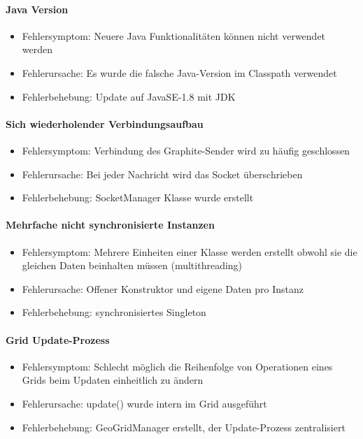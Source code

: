 \paragraph{Java Version}
\begin{itemize}
	\item Fehlersymptom: Neuere Java Funktionalitäten können nicht verwendet werden
	\item Fehlerursache: Es wurde die falsche Java-Version im Classpath verwendet
	\item Fehlerbehebung: Update auf JavaSE-1.8 mit JDK
\end{itemize}

\paragraph{Sich wiederholender Verbindungsaufbau}
\begin{itemize}
	\item Fehlersymptom: Verbindung des Graphite-Sender wird zu häufig geschlossen
	\item Fehlerursache: Bei jeder Nachricht wird das Socket überschrieben
	\item Fehlerbehebung: SocketManager Klasse wurde erstellt
\end{itemize}

\paragraph{Mehrfache nicht synchronisierte Instanzen}
\begin{itemize}
	\item Fehlersymptom: Mehrere Einheiten einer Klasse werden erstellt obwohl sie die gleichen Daten beinhalten müssen (multithreading)
	\item Fehlerursache: Offener Konstruktor und eigene Daten pro Instanz
	\item Fehlerbehebung: synchronisiertes Singleton
\end{itemize}

\paragraph{Grid Update-Prozess}
\begin{itemize}
	\item Fehlersymptom: Schlecht möglich die Reihenfolge von Operationen eines Grids beim Updaten einheitlich zu ändern
	\item Fehlerursache: update() wurde intern im Grid ausgeführt
	\item Fehlerbehebung: GeoGridManager erstellt, der Update-Prozess zentralisiert
\end{itemize}